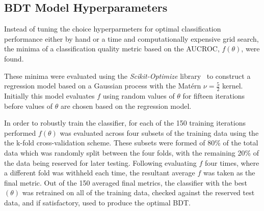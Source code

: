 \subsection{BDT Model Hyperparameters}\label{subsec:hyperparameters}
Instead of tuning the choice hyperparmeters for optimal classification performance either by hand or a time and computationally expensive grid search, the minima of a classification quality metric based on the AUCROC, $f(\theta)$, were found.

These minima were evaluated using the \emph{Scikit-Optimize} library~\cite{scikit-optimise} to construct a regression model based on a Gaussian process with the Mat\'{e}rn $\nu =\frac{5}{2}$ kernel.
Initially this model evaluates $f$ using random values of $\theta$ for fifteen iterations before values of $\theta$ are chosen based on the regression model.

In order to robustly train the classifier, for each of the 150 training iterations performed $f(\theta)$ was evaluated across four subsets of the training data using the the k-fold cross-validation scheme.
These subsets were formed of 80\% of the total data which was randomly split between the four folds, with the remaining 20\% of the data being reserved for later testing.
Following evaluating $f$ four times, where a different fold was withheld each time, the resultant average $f$ was taken as the final metric.
Out of the 150 averaged final metrics, the classifier with the best $(\theta)$ was retrained on all of the training data, checked against the reserved test data, and if satisfactory, used to produce the optimal BDT.

